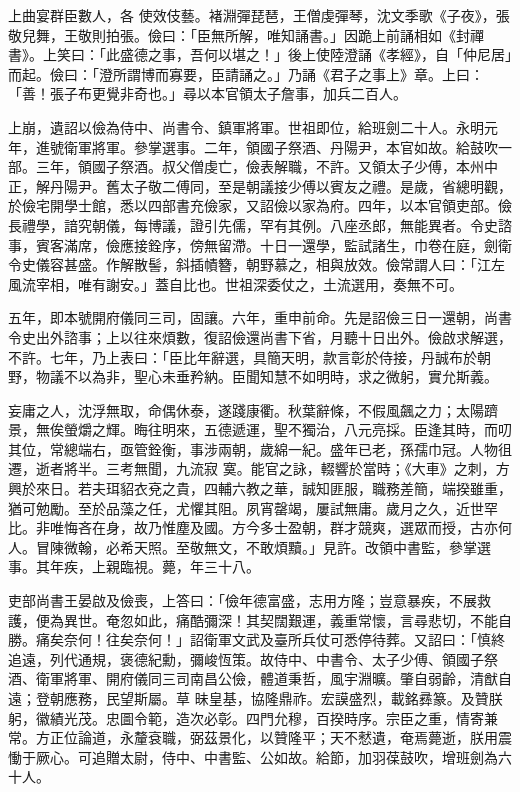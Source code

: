 \begin{pinyinscope}
 上曲宴群臣數人，各
 使效伎藝。褚淵彈琵琶，王僧虔彈琴，沈文季歌《子夜》，張敬兒舞，王敬則拍張。儉曰：「臣無所解，唯知誦書。」因跪上前誦相如《封禪書》。上笑曰：「此盛德之事，吾何以堪之！」後上使陸澄誦《孝經》，自「仲尼居」而起。儉曰：「澄所謂博而寡要，臣請誦之。」乃誦《君子之事上》章。上曰：「善！張子布更覺非奇也。」尋以本官領太子詹事，加兵二百人。



 上崩，遺詔以儉為侍中、尚書令、鎮軍將軍。世祖即位，給班劍二十人。永明元年，進號衛軍將軍。參掌選事。二年，領國子祭酒、丹陽尹，本官如故。給鼓吹一部。三年，領國子祭酒。叔父僧虔亡，儉表解職，不許。又領太子少傅，本州中正，解丹陽尹。舊太子敬二傅同，至是朝議接少傅以賓友之禮。是歲，省總明觀，於儉宅開學士館，悉以四部書充儉家，又詔儉以家為府。四年，以本官領吏部。儉長禮學，諳究朝儀，每博議，證引先儒，罕有其例。八座丞郎，無能異者。令史諮
 事，賓客滿席，儉應接銓序，傍無留滯。十日一還學，監試諸生，巾卷在庭，劍衛令史儀容甚盛。作解散髻，斜插幘簪，朝野慕之，相與放效。儉常謂人曰：「江左風流宰相，唯有謝安。」蓋自比也。世祖深委仗之，土流選用，奏無不可。



 五年，即本號開府儀同三司，固讓。六年，重申前命。先是詔儉三日一還朝，尚書令史出外諮事；上以往來煩數，復詔儉還尚書下省，月聽十日出外。儉啟求解選，不許。七年，乃上表曰：「臣比年辭選，具簡天明，款言彰於侍接，丹誠布於朝野，物議不以為非，聖心未垂矜納。臣聞知慧不如明時，求之微躬，實允斯義。



 妄庸之人，沈浮無取，命偶休泰，遂踐康衢。秋葉辭條，不假風飆之力；太陽躋景，無俟螢爝之輝。晦往明來，五德遞運，聖不獨治，八元亮採。臣逢其時，而叨其位，常總端右，亟管銓衡，事涉兩朝，歲綿一紀。盛年已老，孫孺巾冠。人物徂遷，逝者將半。三考無聞，九流寂
 寞。能官之詠，輟響於當時；《大車》之刺，方興於來日。若夫珥貂衣兗之貴，四輔六教之華，誠知匪服，職務差簡，端揆雖重，猶可勉勵。至於品藻之任，尤懼其阻。夙宵罄竭，屢試無庸。歲月之久，近世罕比。非唯悔吝在身，故乃惟塵及國。方今多士盈朝，群才競爽，選眾而授，古亦何人。冒陳微翰，必希天照。至敬無文，不敢煩黷。」見許。改領中書監，參掌選事。其年疾，上親臨視。薨，年三十八。



 吏部尚書王晏啟及儉喪，上答曰：「儉年德富盛，志用方隆；豈意暴疾，不展救護，便為異世。奄忽如此，痛酷彌深！其契闊艱運，義重常懷，言尋悲切，不能自勝。痛矣奈何！往矣奈何！」詔衛軍文武及臺所兵仗可悉停待葬。又詔曰：「慎終追遠，列代通規，褒德紀勳，彌峻恆策。故侍中、中書令、太子少傅、領國子祭酒、衛軍將軍、開府儀同三司南昌公儉，體道秉哲，風宇淵曠。肇自弱齡，清猷自遠；登朝應務，民望斯屬。草
 昧皇基，協隆鼎祚。宏謨盛烈，載銘彞篆。及贊朕躬，徽績光茂。忠圖令範，造次必彰。四門允穆，百揆時序。宗臣之重，情寄兼常。方正位論道，永釐袞職，弼茲景化，以贊隆平；天不憖遺，奄焉薨逝，朕用震慟于厥心。可追贈太尉，侍中、中書監、公如故。給節，加羽葆鼓吹，增班劍為六十人。




\end{pinyinscope}
